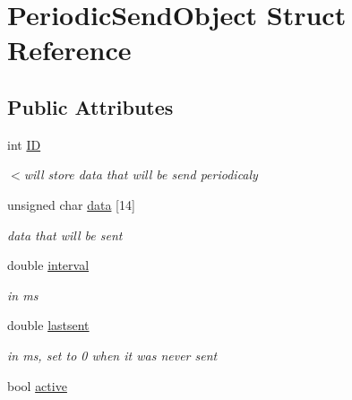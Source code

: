 \hypertarget{struct_periodic_send_object}{}\section{Periodic\+Send\+Object Struct Reference}
\label{struct_periodic_send_object}
\subsection*{Public Attributes}
\begin{DoxyCompactItemize}
\item 
int \hyperlink{struct_periodic_send_object_a45e7f57f2eb1c2dac99db98aeb9d87a1}{I\+D}
\begin{DoxyCompactList}\small\item\em $<$will store data that will be send periodicaly \end{DoxyCompactList}\item 
\hypertarget{struct_periodic_send_object_ace451324a4109d394e7449aa1e44ace5}{}unsigned char \hyperlink{struct_periodic_send_object_ace451324a4109d394e7449aa1e44ace5}{data} \mbox{[}14\mbox{]}\label{struct_periodic_send_object_ace451324a4109d394e7449aa1e44ace5}

\begin{DoxyCompactList}\small\item\em data that will be sent \end{DoxyCompactList}\item 
\hypertarget{struct_periodic_send_object_a0d490ee7f0807d60add8b74bb5b9149c}{}double \hyperlink{struct_periodic_send_object_a0d490ee7f0807d60add8b74bb5b9149c}{interval}\label{struct_periodic_send_object_a0d490ee7f0807d60add8b74bb5b9149c}

\begin{DoxyCompactList}\small\item\em in ms \end{DoxyCompactList}\item 
\hypertarget{struct_periodic_send_object_abc46b3afc42c71d71cf9f65f931eb81e}{}double \hyperlink{struct_periodic_send_object_abc46b3afc42c71d71cf9f65f931eb81e}{lastsent}\label{struct_periodic_send_object_abc46b3afc42c71d71cf9f65f931eb81e}

\begin{DoxyCompactList}\small\item\em in ms, set to 0 when it was never sent \end{DoxyCompactList}\item 
\hypertarget{struct_periodic_send_object_adc8d866f10d03fd22319c521062d9647}{}bool \hyperlink{struct_periodic_send_object_adc8d866f10d03fd22319c521062d9647}{active}\label{struct_periodic_send_object_adc8d866f10d03fd22319c521062d9647}


\end{DoxyCompactItemize}
